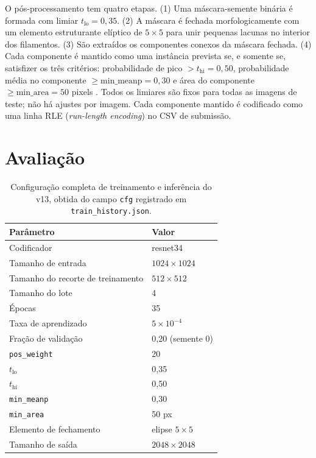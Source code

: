 \documentclass[
  article,
  11pt,
  oneside,
  a4paper,
  english,
  brazil,
  sumario=tradicional
]{abntex2}
\begin{document}
O pós-processamento tem quatro etapas. (1) Uma máscara-semente binária é formada com limiar $t_{\mathrm{lo}}=0{,}35$. (2) A máscara é fechada morfologicamente com um elemento estruturante elíptico de $5\times5$ para unir pequenas lacunas no interior dos filamentos. (3) São extraídos os componentes conexos da máscara fechada. (4) Cada componente é mantido como uma instância prevista se, e somente se, satisfizer os três critérios: probabilidade de pico $>t_{\mathrm{hi}}=0{,}50$, probabilidade média no componente $\geq\mathrm{min\_meanp}=0{,}30$ e área do componente $\geq\mathrm{min\_area}=50$ pixels \cite{afshar2026}. Todos os limiares são fixos para todas as imagens de teste; não há ajustes por imagem. Cada componente mantido é codificado como uma linha RLE (\textit{run-length encoding}) no CSV de submissão.

\section{Avaliação}

\begin{table}[htbp]
\centering
\caption{Configuração completa de treinamento e inferência do v13, obtida do campo \texttt{cfg} registrado em \texttt{train\_history.json}.}
\label{tab:cfg}
\begin{tabular}{ll}
\toprule
Parâmetro & Valor \\
\midrule
Codificador & resnet34 \\
Tamanho de entrada & $1024\times1024$ \\
Tamanho do recorte de treinamento & $512\times512$ \\
Tamanho do lote & 4 \\
Épocas & 35 \\
Taxa de aprendizado & $5\times10^{-4}$ \\
Fração de validação & 0,20 (semente 0) \\
\texttt{pos\_weight} & 20 \\
$t_{\mathrm{lo}}$ & 0,35 \\
$t_{\mathrm{hi}}$ & 0,50 \\
\texttt{min\_meanp} & 0,30 \\
\texttt{min\_area} & 50 px \\
Elemento de fechamento & elipse $5\times5$ \\
Tamanho de saída & $2048\times2048$ \\
\bottomrule
\end{tabular}
\par{}
\end{table}
\end{document}
